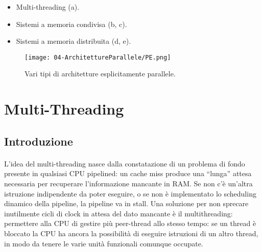 \begin{itemize}
  \item Multi-threading (a). 
  \item Sistemi a memoria condivisa (b, c). 
  \item Sistemi a memoria distribuita (d, e).
\end{itemize}

\begin{figure}[h]
    \centering
    \texttt{[image: 04-ArchitettureParallele/PE.png]}
    \caption{Vari tipi di architetture esplicitamente parallele.}
\end{figure}

\section{Multi-Threading}

\subsection{Introduzione}



\paragraph{}

L’idea del multi-threading nasce dalla constatazione di un problema
di fondo presente in qualsiasi CPU pipelined: un cache miss
produce una “lunga” attesa necessaria per recuperare l’informazione
mancante in RAM. Se non c’è un’altra istruzione indipendente da poter eseguire,
o se non è implementato lo scheduling dinamico della pipeline,
la pipeline va in stall. Una soluzione per non sprecare inutilmente cicli di clock in attesa
del dato mancante è il multithreading: permettere alla CPU di
gestire più peer-thread allo stesso tempo: se un thread è bloccato
la CPU ha ancora la possibilità di eseguire istruzioni di un altro
thread, in modo da tenere le varie unità funzionali comunque
occupate.

